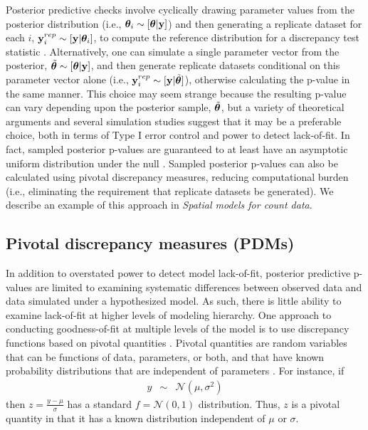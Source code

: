 \documentclass[12pt,english]{article}
\begin{document}
\begin{spacing}{1.9}
Posterior predictive checks involve cyclically drawing parameter
values from the posterior distribution (i.e.,
$\boldsymbol{\theta}_i \sim [\boldsymbol{\theta}| {\bf y}]$) and then generating a replicate
dataset for each $i$, ${\bf y}_i^{rep} \sim [{\bf y} | \boldsymbol{\theta}_i]$, to
compute the reference distribution for a discrepancy test statistic
\citep[][; Appendix A, Alg. 2]{GelmanEtAl2004}.  Alternatively, one
can simulate a single parameter vector from the posterior,
$\tilde{\boldsymbol{\theta}} \sim [\boldsymbol{\theta}| {\bf y}]$, and then generate replicate
datasets conditional on this parameter vector alone (i.e.,
${\bf y}_i^{rep} \sim [{\bf y} | \tilde{\boldsymbol{\theta}}]$), otherwise calculating
the p-value in the same manner.  This choice may seem strange because
the resulting p-value can vary depending upon the posterior sample,
$\tilde{\boldsymbol{\theta}}$, but a variety of theoretical arguments
\citep[e.g.,][]{Johnson2004,Johnson2007,YuanJohnson2012,Gosselin2011}
and several simulation studies \citep[e.g.,][]{Gosselin2011,Zhang2014}
suggest that it may be a preferable choice, both in terms of Type I
error control and power to detect lack-of-fit.  In fact, sampled
posterior p-values are guaranteed to at least have an asymptotic
uniform distribution under the null \citep[i.e., when the model fit to
the data is the ``true" model;][]{Gosselin2011}.  Sampled posterior
p-values can also be calculated using pivotal discrepancy measures,
reducing computational burden (i.e., eliminating the requirement that
replicate datasets be generated). We describe an example of this
approach in \textit{Spatial models for count data}.

\subsection{Pivotal discrepancy measures (PDMs)}

In addition to overstated power to detect model lack-of-fit, posterior
predictive p-values are limited to examining systematic differences
between observed data and data simulated under a hypothesized model.
As such, there is little ability to examine lack-of-fit at higher
levels of modeling hierarchy.  One approach to conducting
goodness-of-fit at multiple levels of the model is to use discrepancy
functions based on pivotal quantities
\citep{Johnson2004,YuanJohnson2012}.  Pivotal quantities are random
variables that can be functions of data, parameters, or both, and that
have known probability distributions that are independent of
parameters \citep[see e.g.,][section 9.2.2]{CasellaBerger1990}.  For
instance, if
\begin{eqnarray*}
  y & \sim & \mathcal{N}(\mu,\sigma^2)
\end{eqnarray*}
then $z = \frac{y-\mu}{\sigma}$ has a standard $f=\mathcal{N}(0,1)$
distribution. Thus, $z$ is a pivotal quantity in that it has a known
distribution independent of $\mu$ or $\sigma$.


\end{spacing}
\end{document}
